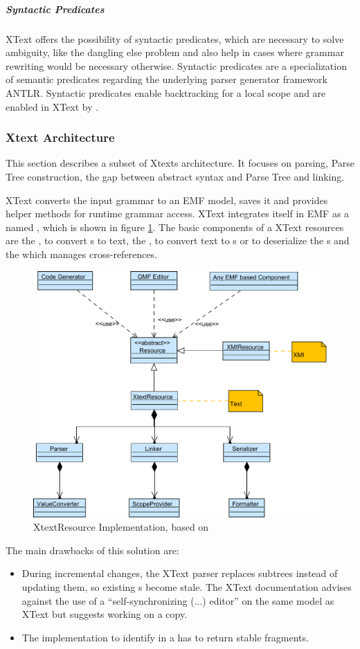 \subparagraph{Syntactic Predicates}
XText offers the possibility of syntactic predicates, which are necessary to solve ambiguity, like the dangling else problem and also help in cases where grammar rewriting would be necessary otherwise. Syntactic predicates are a specialization of semantic predicates regarding the underlying parser generator framework ANTLR. Syntactic predicates enable backtracking for a local scope and are enabled in XText by \code{=>}.


\subsubsection{Xtext Architecture} \label{cha:xtextarch}
This section describes a subset of Xtexts architecture. It focuses on parsing, Parse Tree construction, the gap between abstract syntax and Parse Tree and linking.

XText converts the input grammar to an EMF model, saves it and provides helper methods for runtime grammar access. XText integrates itself in EMF as a  named , which is shown in figure \ref{XtextArch}.  The basic components of a XText resources are the , to convert s to text, the , to convert text to s or to deserialize the s and the  which manages cross-references. 

\begin{figure}
\centering
\includegraphics[scale=0.75]{gfx/ex/Xtext} 
\caption{XtextResource Implementation, based on \cite{XTextMan}}
\label{XtextArch}
\end{figure}
The main drawbacks of this solution are:
\begin{itemize}
	\item During incremental changes, the XText parser replaces subtrees instead of updating them, so existing s become stale. The XText documentation advises against the use of a ``self-synchronizing (...) editor'' on the same model as XText but suggests working on a copy.
	\item The implementation to identify  in a  has to return stable fragments.
\end{itemize}

